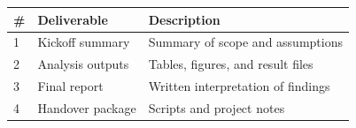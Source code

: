 \begin{longtable}{p{0.8cm}p{5cm}p{8.5cm}}
\toprule
\textbf{\#} & \textbf{Deliverable} & \textbf{Description} \\
\midrule
1 & Kickoff summary & Summary of scope and assumptions \\
2 & Analysis outputs & Tables, figures, and result files \\
3 & Final report & Written interpretation of findings \\
4 & Handover package & Scripts and project notes \\
\bottomrule
\end{longtable}